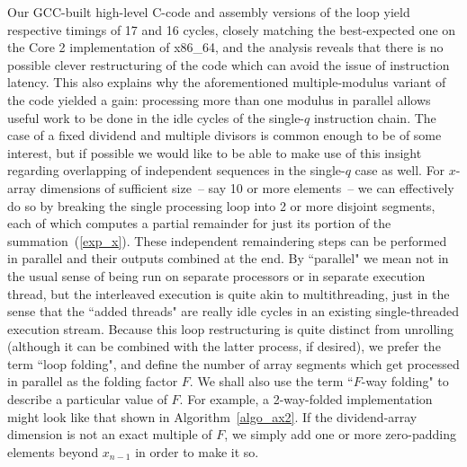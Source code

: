 \documentclass{article}
\begin{document}
Our GCC-built high-level C-code and assembly versions of the loop yield respective timings of 17 and 16 cycles, closely matching the best-expected one on the Core 2 implementation of x86\_64, and the analysis reveals that there is no possible clever restructuring of the code which can avoid the issue of instruction latency. This also explains why the aforementioned multiple-modulus variant of the code yielded a gain: processing more than one modulus in parallel allows useful work to be done in the idle cycles of the single-$q$ instruction chain. The case of a fixed dividend and multiple divisors is common enough to be of some interest, but if possible we would like to be able to make use of this insight regarding overlapping of independent sequences in the single-$q$ case as well. For $x$-array dimensions of sufficient size~-- say 10 or more elements~-- we can effectively do so by breaking the single processing loop into 2 or more disjoint segments, each of which computes a partial remainder for just its portion of the summation~(\ref{exp_x}). These independent remaindering steps can be performed in parallel and their outputs combined at the end. By ``parallel" we mean not in the usual sense of being run on separate processors or in separate execution thread, but the interleaved execution is quite akin to multithreading, just in the sense that the ``added threads" are really idle cycles in an existing single-threaded execution stream. Because this loop restructuring is quite distinct from unrolling (although it can be combined with the latter process, if desired), we prefer the term ``loop folding", and define the number of array segments which get processed in parallel as the folding factor $F$. We shall also use the term ``$F$-way folding" to describe a particular value of $F$. For example, a 2-way-folded implementation might look like that shown in Algorithm~\ref{algo_ax2}. If the dividend-array dimension is not an exact multiple of $F$, we simply add one or more zero-padding elements beyond $x_{n-1}$ in order to make it so.
\end{document}
